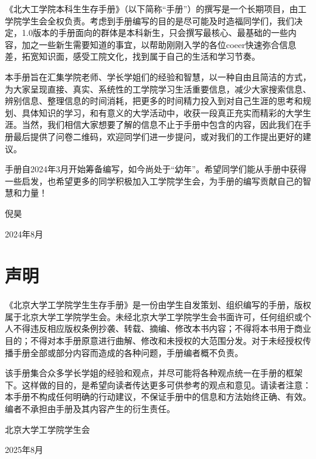 \documentclass[11pt,oneside]{book}
\begin{document}
《北大工学院本科生生存手册》（以下简称“手册”）的撰写是一个长期项目，由工学院学生会全权负责。考虑到手册编写的目的是尽可能及时造福同学们，我们决定，1.0版本的手册面向的群体是本科新生，只会撰写最核心、最基础的一些内容，加之一些新生需要知道的事宜，以帮助刚刚入学的各位coeer快速弥合信息差，拓宽知识面，感受工院文化，找到属于自己的生活和学习节奏。

\vspace{10pt}

本手册旨在汇集学院老师、学长学姐们的经验和智慧，以一种自由且简洁的方式，为大家呈现直接、真实、系统性的工学院学习生活重要信息，减少大家搜索信息、辨别信息、整理信息的时间消耗，把更多的时间精力投入到对自己生涯的思考和规划、具体知识的学习，和有意义的大学活动中，收获一段真正充实而精彩的大学生涯。当然，我们相信大家想要了解的信息不止于手册中包含的内容，因此我们在手册最后提供了问卷二维码，欢迎同学们进一步提问，或对我们的工作提出更好的建议。

\vspace{10pt}

手册自2024年3月开始筹备编写，如今尚处于“幼年”。希望同学们能从手册中获得一些启发，也希望更多的同学积极加入工学院学生会，为手册的编写贡献自己的智慧和力量！
\begin{flushright}
    倪昊

    2024年8月
\end{flushright}


\chapter*{声明}

《北京大学工学院学生生存手册》是一份由学生自发策划、组织编写的手册，版权属于北京大学工学院学生会。未经北京大学工学院学生会书面许可，任何组织或个人不得违反相应版权条例抄袭、转载、摘编、修改本书内容；不得将本书用于商业目的；不得对本手册原意进行曲解、修改和未授权的大范围分发。对于未经授权传播手册全部或部分内容而造成的各种问题，手册编者概不负责。

\vspace{10pt}

该手册集合众多学长学姐的经验和观点，并尽可能将各种观点统一在手册的框架下。这样做的目的，是希望向读者传达更多可供参考的观点和意见。请读者注意：本手册不构成任何明确的行动建议，不保证手册中的信息和方法始终正确、有效。编者不承担由手册及其内容产生的衍生责任。
\begin{flushright}
    北京大学工学院学生会

    2025年8月
\end{flushright}
\end{document}
